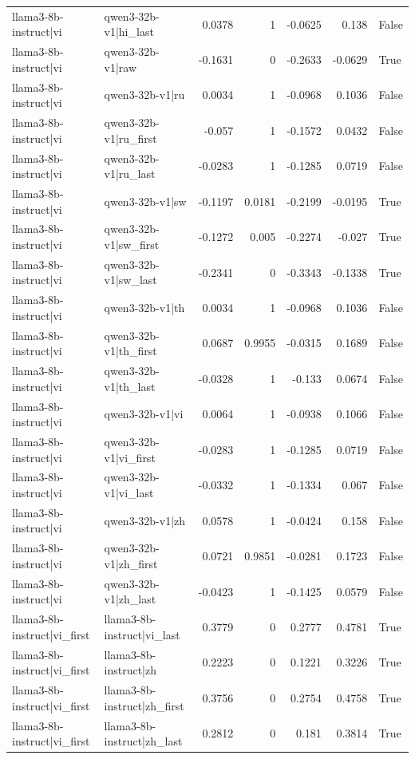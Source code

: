 \begin{table}
\begin{tabular}{l l r r r r l}
llama3-8b-instruct|vi & qwen3-32b-v1|hi_last & 0.0378 & 1 & -0.0625 & 0.138 & False \\
llama3-8b-instruct|vi & qwen3-32b-v1|raw & -0.1631 & 0 & -0.2633 & -0.0629 & True \\
llama3-8b-instruct|vi & qwen3-32b-v1|ru & 0.0034 & 1 & -0.0968 & 0.1036 & False \\
llama3-8b-instruct|vi & qwen3-32b-v1|ru_first & -0.057 & 1 & -0.1572 & 0.0432 & False \\
llama3-8b-instruct|vi & qwen3-32b-v1|ru_last & -0.0283 & 1 & -0.1285 & 0.0719 & False \\
llama3-8b-instruct|vi & qwen3-32b-v1|sw & -0.1197 & 0.0181 & -0.2199 & -0.0195 & True \\
llama3-8b-instruct|vi & qwen3-32b-v1|sw_first & -0.1272 & 0.005 & -0.2274 & -0.027 & True \\
llama3-8b-instruct|vi & qwen3-32b-v1|sw_last & -0.2341 & 0 & -0.3343 & -0.1338 & True \\
llama3-8b-instruct|vi & qwen3-32b-v1|th & 0.0034 & 1 & -0.0968 & 0.1036 & False \\
llama3-8b-instruct|vi & qwen3-32b-v1|th_first & 0.0687 & 0.9955 & -0.0315 & 0.1689 & False \\
llama3-8b-instruct|vi & qwen3-32b-v1|th_last & -0.0328 & 1 & -0.133 & 0.0674 & False \\
llama3-8b-instruct|vi & qwen3-32b-v1|vi & 0.0064 & 1 & -0.0938 & 0.1066 & False \\
llama3-8b-instruct|vi & qwen3-32b-v1|vi_first & -0.0283 & 1 & -0.1285 & 0.0719 & False \\
llama3-8b-instruct|vi & qwen3-32b-v1|vi_last & -0.0332 & 1 & -0.1334 & 0.067 & False \\
llama3-8b-instruct|vi & qwen3-32b-v1|zh & 0.0578 & 1 & -0.0424 & 0.158 & False \\
llama3-8b-instruct|vi & qwen3-32b-v1|zh_first & 0.0721 & 0.9851 & -0.0281 & 0.1723 & False \\
llama3-8b-instruct|vi & qwen3-32b-v1|zh_last & -0.0423 & 1 & -0.1425 & 0.0579 & False \\
llama3-8b-instruct|vi_first & llama3-8b-instruct|vi_last & 0.3779 & 0 & 0.2777 & 0.4781 & True \\
llama3-8b-instruct|vi_first & llama3-8b-instruct|zh & 0.2223 & 0 & 0.1221 & 0.3226 & True \\
llama3-8b-instruct|vi_first & llama3-8b-instruct|zh_first & 0.3756 & 0 & 0.2754 & 0.4758 & True \\
llama3-8b-instruct|vi_first & llama3-8b-instruct|zh_last & 0.2812 & 0 & 0.181 & 0.3814 & True \\

\end{tabular}
\end{table}
